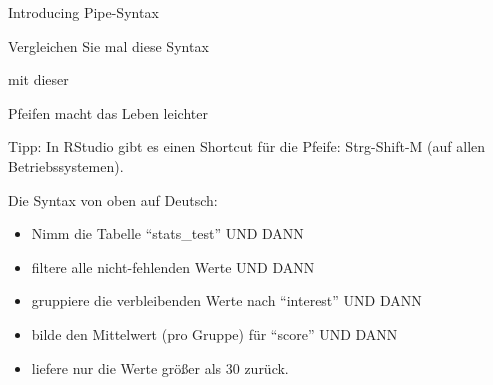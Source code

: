 \begin{frame}[fragile]{Introducing Pipe-Syntax}

Vergleichen Sie mal diese Syntax

\begin{Shaded}
\begin{Highlighting}[]
\NormalTok{(}\NormalTok{(}\NormalTok{(}\OperatorTok{!} 
\OperatorTok{>}\StringTok{ }\NormalTok{)}
\end{Highlighting}
\end{Shaded}

mit dieser

\begin{Shaded}
\end{Shaded}

\end{frame}

\begin{frame}{Pfeifen macht das Leben leichter}

Tipp: In RStudio gibt es einen Shortcut für die Pfeife: Strg-Shift-M
(auf allen Betriebssystemen).

Die Syntax von oben auf Deutsch:

\begin{itemize}
\tightlist
\item
  Nimm die Tabelle ``stats\_test'' UND DANN\\
\item
  filtere alle nicht-fehlenden Werte UND DANN\\
\item
  gruppiere die verbleibenden Werte nach ``interest'' UND DANN\\
\item
  bilde den Mittelwert (pro Gruppe) für ``score'' UND DANN\\
\item
  liefere nur die Werte größer als 30 zurück.
\end{itemize}

\end{frame}


